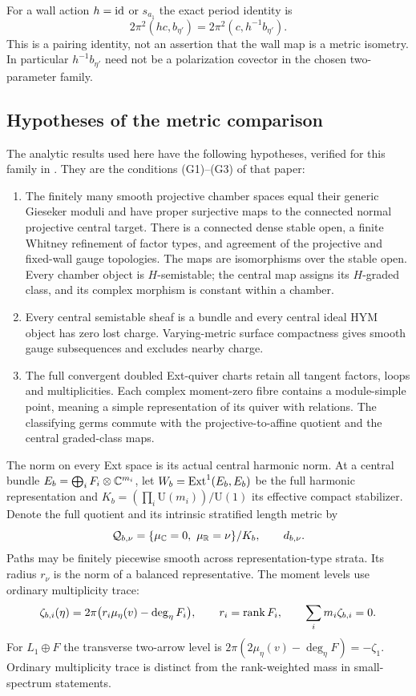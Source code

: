 For a wall action $h=\operatorname{id}$ or $s_{a_1}$ the exact period
identity is
\begin{equation}\label{eq:period-action}
 2\pi^2(hc,b_{\eta'})=2\pi^2(c,h^{-1}b_{\eta'}).
\end{equation}
This is a pairing identity, not an assertion that the wall
map is a metric isometry. In particular $h^{-1}b_{\eta'}$
need not be a polarization covector in the chosen two-parameter
family.

\subsection{Hypotheses of the metric comparison}
The analytic results used here have the following hypotheses,
verified for this family in \cite[\S9.1]{wuebben18}.
They are the conditions (G1)--(G3) of that paper:
\begin{enumerate}
\item The finitely many smooth projective chamber spaces equal
their generic Gieseker moduli and have proper surjective
maps to the connected normal projective central target.
There is a connected dense stable open, a finite Whitney
refinement of factor types, and agreement of the projective
and fixed-wall gauge topologies. The maps are isomorphisms
over the stable open. Every chamber object is $H$-semistable;
the central map assigns its $H$-graded class, and its complex
morphism is constant within a chamber.
\item Every central semistable sheaf is a bundle and every
central ideal HYM object has zero lost charge. Varying-metric
surface compactness gives smooth gauge subsequences and
excludes nearby charge.
\item The full convergent doubled Ext-quiver charts retain
all tangent factors, loops and multiplicities. Each complex
moment-zero fibre contains a module-simple point, meaning
a simple representation of its quiver with relations.
The classifying germs commute with the projective-to-affine
quotient and the central graded-class maps.
\end{enumerate}
The norm on every Ext space is its actual central harmonic
norm. At a central bundle $E_b=\bigoplus_iF_i\otimes\mathbb C^{m_i}$,
let $W_b=\operatorname{Ext}^1(E_b,E_b)$ be the full harmonic representation
and $K_b=(\prod_i\mathrm U(m_i))/\mathrm U(1)$ its effective
compact stabilizer. Denote the full quotient and its intrinsic
stratified length metric by
\[
 \mathcal Q_{b,\nu}=\{\mu_{\mathbb C}=0,\ \mu_{\mathbb R}=\nu\}/K_b,
 \qquad d_{b,\nu}.
\]
Paths may be finitely piecewise smooth across representation-type
strata. Its radius $r_\nu$ is the norm of a balanced representative.
The moment levels use ordinary multiplicity trace:
\begin{equation}\label{eq:general-levels}
 \zeta_{b,i}(\eta)=2\pi\bigl(r_i\mu_\eta(v)-\deg_\eta F_i\bigr),
 \qquad r_i=\operatorname{rank} F_i,\qquad \sum_i m_i\zeta_{b,i}=0.
\end{equation}
For $L_1\oplus F$ the transverse two-arrow level is
$2\pi(2\mu_\eta(v)-\deg_\eta F)=-\zeta_1$.
Ordinary multiplicity trace is distinct from the rank-weighted
mass in small-spectrum statements.

